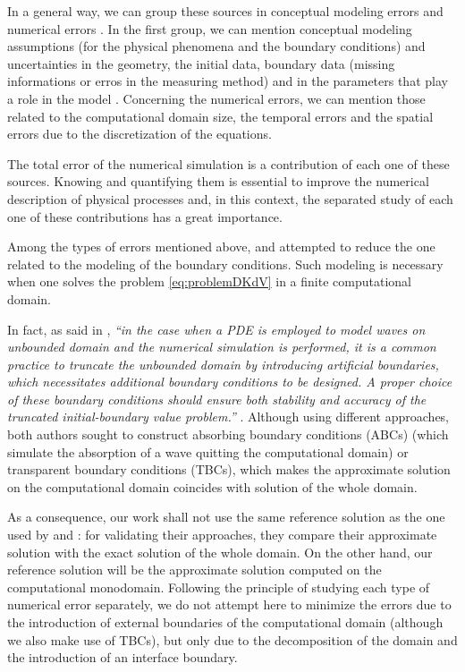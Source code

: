 \indent In a general way, we can group these sources in conceptual modeling errors and numerical errors \cite{roache1997}. In the first group, we can mention conceptual modeling assumptions (for the physical phenomena and the boundary conditions) and uncertainties in the geometry, the initial data, boundary data (missing informations or erros in the measuring method) and in the parameters that play a role in the model \cite{roache1997,balagurusamy2008}. Concerning the numerical errors, we can mention those related to the computational domain size, the temporal errors and the spatial errors due to the discretization of the equations.  \cite{karniadakis1995,roache1997} 

\indent The total error of the numerical simulation is a contribution of each one of these sources. Knowing and quantifying them is essential to improve the numerical description of physical processes and, in this context, the separated study of each one of these contributions has a great importance.

\indent Among the types of errors mentioned above, \cite{zheng2008} and \cite{besse2015} attempted to reduce the one related to the modeling of the boundary conditions. Such modeling is necessary when one solves the problem \eqref{eq:problemDKdV} in a finite computational domain.

\indent In fact, as said in \cite{zheng2008}, \emph{``in the case when a PDE is employed to model waves on unbounded domain and the numerical simulation is performed, it is a common practice to truncate the unbounded domain by introducing artificial boundaries, which necessitates additional boundary conditions to be designed. A proper choice of these boundary conditions should ensure both stability and accuracy of the truncated initial-boundary value problem.''} . Although using different approaches, both authors sought to construct absorbing boundary conditions (ABCs) (which simulate the absorption of a wave quitting the computational domain) or transparent boundary conditions (TBCs), which makes the approximate solution on the computational domain coincides with solution of the whole domain.

\indent As a consequence, our work shall not use the same reference solution as the one used by \cite{zheng2008} and \cite{besse2015} : for validating their approaches,  they compare their approximate solution with the exact solution of the whole domain. On the other hand, our reference solution will be the approximate solution computed on the computational monodomain. Following the principle of studying each type of numerical error separately, we do not attempt here to minimize the errors due to the introduction of external boundaries of the computational domain (although we also make use of TBCs), but only due to the decomposition of the domain and the introduction of an interface boundary.

